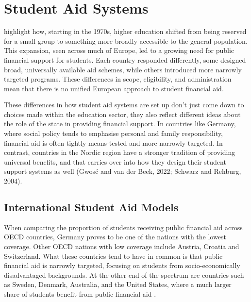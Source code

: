%
%
%
%
\section{Student Aid Systems}
\label{section:student-aid-systems}

\cite{schwarz_study_2004} highlight how, starting in the 1970s, higher education shifted from being reserved for a small group to something more broadly accessible to the general population. This expansion, seen across much of Europe, led to a growing need for public financial support for students. Each country responded differently, some designed broad, universally available aid schemes, while others introduced more narrowly targeted programs. These differences in scope, eligibility, and administration mean that there is no unified European approach to student financial aid.

These differences in how student aid systems are set up don’t just come down to choices made within the education sector, they also reflect different ideas about the role of the state in providing financial support. In countries like Germany, where social policy tends to emphasise personal and family responsibility, financial aid is often tightly means-tested and more narrowly targeted. In contrast, countries in the Nordic region have a stronger tradition of providing universal benefits, and that carries over into how they design their student support systems as well (Gwosć and van der Beek, 2022; Schwarz and Rehburg, 2004).


%
%
\subsection{International Student Aid Models} \label{subsection:international-sstudent-aid-models} 

When comparing the proportion of students receiving public financial aid across OECD countries, Germany proves to be one of the nations with the lowest coverage. Other OECD nations with low coverage include Austria, Croatia and Switzerland. What these countries tend to have in common is that public financial aid is narrowly targeted, focusing on students from socio-economically disadvantaged backgrounds. At the other end of the spectrum are countries such as Sweden, Denmark, Australia, and the United States, where a much larger share of students benefit from public financial aid \citep{oecd_education_2024}.

